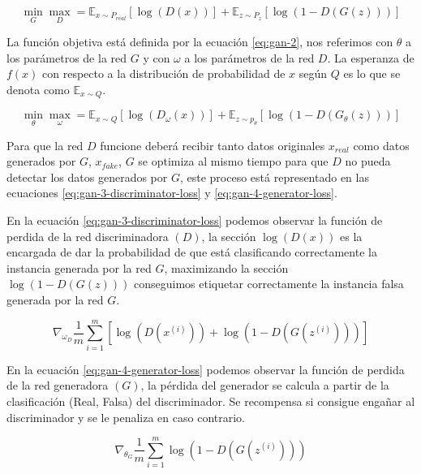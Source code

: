 \begin{equation}
    \min_{G}\max_{D} = \mathbb{E}_{x\sim{}P_{real}} \left[\log\left(D(x)\right)\right] + \mathbb{E}_{z\sim{}P_{z}} \left[\log\left(1-D(G(z))\right)\right]
    \label{eq:gan-1}
\end{equation}

La función objetiva está definida por la ecuación \ref{eq:gan-2}, nos referimos con $\theta$ a los parámetros de la red $G$ y con $\omega$ a los parámetros de la red $D$. La esperanza de $f(x)$ con respecto a la distribución de probabilidad de ${x}$ según ${Q}$ es lo que se denota como ${\mathbb{E}_{x \sim Q}}$.

\begin{equation}
    \min_{\theta}\max_{\omega} = \mathbb{E}_{x\sim{}Q} \left[\log\left(D_{\omega}(x)\right)\right] + \mathbb{E}_{z \sim{}p_{\theta}} \left[\log\left(1-D(G_{\theta}(z))\right)\right]
    \label{eq:gan-2}
\end{equation}

Para que la red ${D}$ funcione deberá recibir tanto datos originales $x_{real}$ como datos generados por ${G}$, ${x_{fake}}$, $G$ se optimiza al mismo tiempo para que $D$ no pueda detectar los datos generados por $G$, este proceso está representado en las ecuaciones \ref{eq:gan-3-discriminator-loss} y \ref{eq:gan-4-generator-loss}.

En la ecuación \ref{eq:gan-3-discriminator-loss} podemos observar la función de perdida de la red discriminadora $(D)$, la sección ${\log\left(D(x)\right)}$ es la encargada de dar la probabilidad de que está clasificando correctamente la instancia generada por la red $G$, maximizando la sección $\log\left(1 - D(G(z))\right)$ conseguimos etiquetar correctamente la instancia falsa generada por la red ${G}$.

\begin{equation}
    \nabla_{\omega_{D}} \frac{1}{m} \sum_{i=1}^{m} \left[ \log\left(D(x^{(i)})\right) + \log\left(1-D(G(z^{(i)}))\right) \right]
    \label{eq:gan-3-discriminator-loss}
\end{equation}

En la ecuación \ref{eq:gan-4-generator-loss} podemos observar la función de perdida de la red generadora $(G)$, la pérdida del generador se calcula a partir de la clasificación (Real, Falsa) del discriminador. Se recompensa si consigue engañar al discriminador y se le penaliza en caso contrario.

\begin{equation}
    \nabla_{\theta_{G}} \frac{1}{m} \sum_{i=1}^{m} \log\left(1-D(G(z^{(i)}))\right)
    \label{eq:gan-4-generator-loss}
\end{equation}


